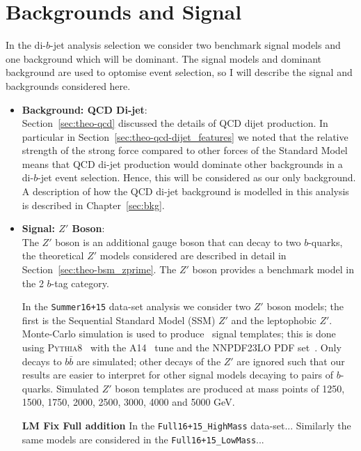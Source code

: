 \section{Backgrounds and Signal}
\label{sec:evt-s+b}

In the di-$b$-jet analysis selection we consider two
benchmark signal models and one background which will be dominant.
The signal models and dominant background are
used to optomise event selection, so I will describe
the signal and backgrounds considered here.

\begin{itemize}[leftmargin=*]
\item\textbf{Background: QCD Di-jet}: \\
  Section~\ref{sec:theo-qcd} discussed the details of QCD dijet production.
  In particular in Section~\ref{sec:theo-qcd-dijet_features} we noted that the
  relative strength of the strong force compared to other forces
  of the Standard Model means that
  QCD di-jet production would dominate other backgrounds in a di-$b$-jet event selection.
  Hence, this will be considered as our only background.
  A description of how the QCD di-jet background is modelled in this analysis is described in Chapter~\ref{sec:bkg}.\\

\item\textbf{Signal: $Z'$ Boson}: \\
  The $Z'$ boson is an additional gauge boson that can decay to two $b$-quarks,
  the theoretical $Z'$ models considered are
  described in detail in Section~\ref{sec:theo-bsm_zprime}.
  The $Z'$ boson provides a benchmark model in the 2 $b$-tag category.

  In the \verb|Summer16+15| data-set analysis we consider two $Z'$ boson models;
  the first is the Sequential Standard Model (SSM) $Z'$ and the leptophobic $Z'$.
  Monte-Carlo simulation is used to produce \mjj~signal templates;
  this is done using \textsc{Pythia8}~\cite{dibjet-pythia8} with the A14~\cite{dibjet-a14} tune and the NNPDF23LO PDF set~\cite{dibjet-nnpdf}.
  Only decays to $b\bar{b}$ are simulated;
  other decays of the  $Z'$  are ignored such that our
  results are easier to interpret for other signal models decaying to pairs of $b$-quarks.
  Simulated $Z'$ boson templates are produced at mass points of
  1250, 1500, 1750, 2000, 2500, 3000, 4000 and 5000 GeV.
  
  \textbf{LM Fix Full addition}
  In the \verb|Full16+15_HighMass| data-set...
  Similarly the same models are considered in the \verb|Full16+15_LowMass|... \\


\end{itemize}
